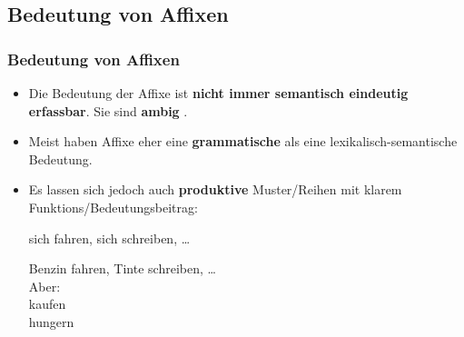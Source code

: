 \subsection{Bedeutung von Affixen}

\begin{frame}
\frametitle{Bedeutung von Affixen}

\begin{itemize}
\item Die Bedeutung der Affixe ist \textbf{nicht immer semantisch eindeutig erfassbar}. Sie sind \textbf{ambig} .

\item Meist haben Affixe eher eine \textbf{grammatische} als eine lexikalisch-semantische Bedeutung. 

\item Es lassen sich jedoch auch \textbf{produktive} Muster/Reihen mit klarem Funktions/Bedeutungsbeitrag:

\ea 
\ea sich fahren, sich schreiben, %
\dots\ \ras {}

\ex Benzin fahren, Tinte schreiben, %
\dots\ \ras {}\\

\ex Aber:\\
kaufen \ras {}\\
hungern \ras {}
\z
\z 
\end{itemize}

\end{frame}



